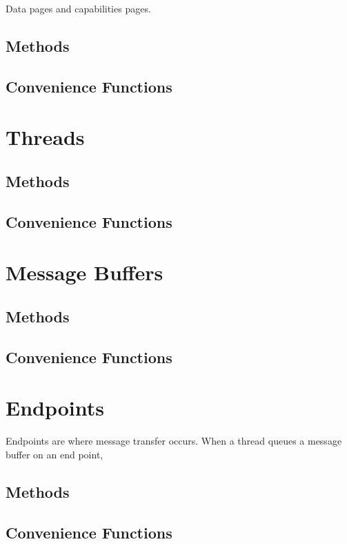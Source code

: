 Data pages and capabilities pages.

\subsection{Methods}

\subsection{Convenience Functions}

\cleardoublepage
\section{Threads}

\subsection{Methods}

\subsection{Convenience Functions}

\cleardoublepage
\section{Message Buffers}

\subsection{Methods}

\subsection{Convenience Functions}

\cleardoublepage
\section{Endpoints}

Endpoints are where message transfer occurs.  When a thread queues a
message buffer on an end point, 

\subsection{Methods}

\subsection{Convenience Functions}

